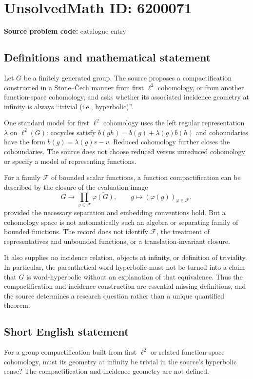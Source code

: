 \documentclass[11pt]{article}
\begin{document}
\section*{UnsolvedMath ID: 6200071}
\textbf{Source problem code:} catalogue entry
\subsection{Definitions and mathematical statement}
Let $G$ be a finitely generated group. The source proposes a compactification constructed in a Stone--\v{C}ech manner from first $\ell^2$ cohomology, or from another function-space cohomology, and asks whether its associated incidence geometry at infinity is always ``trivial (i.e., hyperbolic)''.

One standard model for first $\ell^2$ cohomology uses the left regular representation $\lambda$ on $\ell^2(G)$: cocycles satisfy $b(gh)=b(g)+\lambda(g)b(h)$ and coboundaries have the form $b(g)=\lambda(g)v-v$. Reduced cohomology further closes the coboundaries. The source does not choose reduced versus unreduced cohomology or specify a model of representing functions.

For a family $\mathcal F$ of bounded scalar functions, a function compactification can be described by the closure of the evaluation image
\[
G\longrightarrow\prod_{\varphi\in\mathcal F}\overline{\varphi(G)},\qquad
g\longmapsto(\varphi(g))_{\varphi\in\mathcal F},
\]
provided the necessary separation and embedding conventions hold. But a cohomology space is not automatically such an algebra or separating family of bounded functions. The record does not identify $\mathcal F$, the treatment of representatives and unbounded functions, or a translation-invariant closure.

It also supplies no incidence relation, objects at infinity, or definition of triviality. In particular, the parenthetical word hyperbolic must not be turned into a claim that $G$ is word-hyperbolic without an explanation of that equivalence. Thus the compactification and incidence construction are essential missing definitions, and the source determines a research question rather than a unique quantified theorem.
\subsection{Short English statement}
For a group compactification built from first $\ell^2$ or related function-space cohomology, must its geometry at infinity be trivial in the source's hyperbolic sense? The compactification and incidence geometry are not defined.
\end{document}
